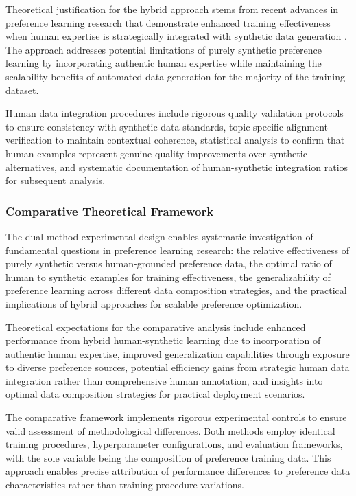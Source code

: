 Theoretical justification for the hybrid approach stems from recent advances in preference learning research that demonstrate enhanced training effectiveness when human expertise is strategically integrated with synthetic data generation \cite{poddar2024personalizing_rlhf}. The approach addresses potential limitations of purely synthetic preference learning by incorporating authentic human expertise while maintaining the scalability benefits of automated data generation for the majority of the training dataset.

Human data integration procedures include rigorous quality validation protocols to ensure consistency with synthetic data standards, topic-specific alignment verification to maintain contextual coherence, statistical analysis to confirm that human examples represent genuine quality improvements over synthetic alternatives, and systematic documentation of human-synthetic integration ratios for subsequent analysis.

\subsubsection{Comparative Theoretical Framework}

The dual-method experimental design enables systematic investigation of fundamental questions in preference learning research: the relative effectiveness of purely synthetic versus human-grounded preference data, the optimal ratio of human to synthetic examples for training effectiveness, the generalizability of preference learning across different data composition strategies, and the practical implications of hybrid approaches for scalable preference optimization.

Theoretical expectations for the comparative analysis include enhanced performance from hybrid human-synthetic learning due to incorporation of authentic human expertise, improved generalization capabilities through exposure to diverse preference sources, potential efficiency gains from strategic human data integration rather than comprehensive human annotation, and insights into optimal data composition strategies for practical deployment scenarios.

The comparative framework implements rigorous experimental controls to ensure valid assessment of methodological differences. Both methods employ identical training procedures, hyperparameter configurations, and evaluation frameworks, with the sole variable being the composition of preference training data. This approach enables precise attribution of performance differences to preference data characteristics rather than training procedure variations.

